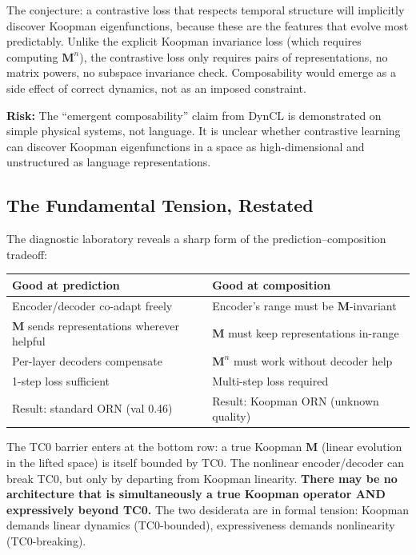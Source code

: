 \documentclass[11pt, a4paper]{article}
\newcommand{\M}{\mathbf{M}}
\theoremstyle{plain}
\theoremstyle{remark}
\begin{document}
The conjecture: a contrastive loss that respects temporal structure will implicitly discover Koopman eigenfunctions, because these are the features that evolve most predictably.
Unlike the explicit Koopman invariance loss (which requires computing $\M^n$), the contrastive loss only requires pairs of representations, no matrix powers, no subspace invariance check.
Composability would emerge as a side effect of correct dynamics, not as an imposed constraint.

\textbf{Risk:} The ``emergent composability'' claim from DynCL is demonstrated on simple physical systems, not language.
It is unclear whether contrastive learning can discover Koopman eigenfunctions in a space as high-dimensional and unstructured as language representations.

\subsection{The Fundamental Tension, Restated}

The diagnostic laboratory reveals a sharp form of the prediction--composition tradeoff:

\begin{center}\small
\begin{tabular}{@{}p{5.5cm}p{5.5cm}@{}}
\toprule
\textbf{Good at prediction} & \textbf{Good at composition} \\
\midrule
Encoder/decoder co-adapt freely & Encoder's range must be $\M$-invariant \\
$\M$ sends representations wherever helpful & $\M$ must keep representations in-range \\
Per-layer decoders compensate & $\M^n$ must work without decoder help \\
1-step loss sufficient & Multi-step loss required \\
Result: standard ORN (val 0.46) & Result: Koopman ORN (unknown quality) \\
\bottomrule
\end{tabular}
\end{center}

The TC0 barrier enters at the bottom row: a true Koopman $\M$ (linear evolution in the lifted space) is itself bounded by TC0.
The nonlinear encoder/decoder can break TC0, but only by departing from Koopman linearity.
\textbf{There may be no architecture that is simultaneously a true Koopman operator AND expressively beyond TC0.}
The two desiderata are in formal tension: Koopman demands linear dynamics (TC0-bounded), expressiveness demands nonlinearity (TC0-breaking).
\end{document}
